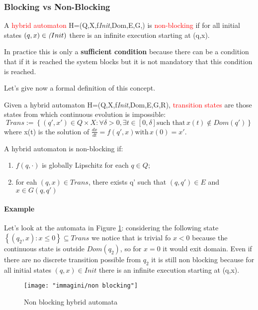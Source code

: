\subsubsection{Blocking vs Non-Blocking}
A \textcolor{red}{hybrid automaton} H=(Q,X,f\textit{Init},Dom,E,G,) is \textcolor{red}{non-blocking} if for all initial states $(q,x) \in \emph(Init)$ there is an infinite execution starting at (q,x).
\begin{remark}
In practice this is only a \textbf{sufficient condition} because there can be a condition that if it is reached the system blocks but it is not mandatory that this condition is reached.
\end{remark}
Let's give now a formal definition of this concept.
\begin{defn}
	Given a hybrid automaton  H=(Q,X,f\textit{Init},Dom,E,G,R), \textcolor{red}{transition states} are those states from which continuous evolution is impossible:
	\[
	Trans:=\left\{(q',x')\in Q\times X\colon \forall \delta>0,\exists t \in[0,\delta] \text{such that} \, x(t)\notin Dom(q')\right\}
	\] where x(t) is the solution of $\frac{dx}{dt}=f(q',x) \text{with} \, x(0)=x'$.
\end{defn}
\begin{tcolorbox}
	A hybrid automaton is non-blocking if:
	\begin{enumerate}
		\item $f(q,\cdot)$ is globally Lipschitz for each $q\in Q$;
		\item for eah $(q,x)\in Trans$, there exists q' such that $(q,q')\in E$ and $x \in G(q,q')$ 
	\end{enumerate}
\end{tcolorbox}
\paragraph{Example}
Let's look at the automata in Figure \ref{fig:non-blocking}:
considering the following state$\left\{(q_2,x)\colon x\le 0\right\} \subseteq Trans$ we notice that is trivial fo $x<0$ because the continuous state is outside $Dom(q_2)$, so for $x=0$ it would exit domain. Even if  there are no discrete transition possible from $q_2$ it is still non blocking because for all initial states $(q,x)\in Init$ there is an infinite execution starting at (q,x).
\begin{figure}[h]
	\centering
	\texttt{[image: "immagini/non blocking"]}
	\caption{Non blocking hybrid automata}
	\label{fig:non-blocking}
\end{figure}
